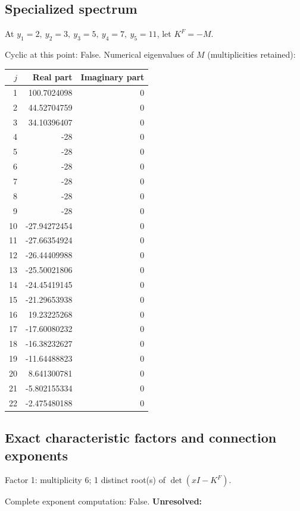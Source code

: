 \documentclass[10pt,a4paper]{article}
\newcommand{\fitmath}[1]{\sbox{\mathbox}{$\displaystyle #1$}\ifdim\wd\mathbox>\linewidth\resizebox{\linewidth}{!}{\usebox{\mathbox}}\else\usebox{\mathbox}\fi}
\begin{document}
\subsection*{Specialized spectrum}
At $y_1=2,\ y_2=3,\ y_3=5,\ y_4=7,\ y_5=11$, let $K^F=-M$.
\begin{center}\fitmath{\Delta=0}\end{center}
Cyclic at this point: False.
Numerical eigenvalues of $M$ (multiplicities retained):
\begin{center}\small\begin{tabular}{rrr}\toprule $j$ & Real part & Imaginary part\\\midrule
1 & 100.7024098 & 0\\
2 & 44.52704759 & 0\\
3 & 34.10396407 & 0\\
4 & -28 & 0\\
5 & -28 & 0\\
6 & -28 & 0\\
7 & -28 & 0\\
8 & -28 & 0\\
9 & -28 & 0\\
10 & -27.94272454 & 0\\
11 & -27.66354924 & 0\\
12 & -26.44409988 & 0\\
13 & -25.50021806 & 0\\
14 & -24.45419145 & 0\\
15 & -21.29653938 & 0\\
16 & 19.23225268 & 0\\
17 & -17.60080232 & 0\\
18 & -16.38232627 & 0\\
19 & -11.64488823 & 0\\
20 & 8.641300781 & 0\\
21 & -5.802155334 & 0\\
22 & -2.475480188 & 0\\
\bottomrule\end{tabular}\end{center}
\subsection*{Exact characteristic factors and connection exponents}
Factor 1: multiplicity 6; 1 distinct root(s) of $\det(xI-K^F)$.
\begin{center}\fitmath{\begin{aligned}p_{1}(x)&=x - 28\end{aligned}}\end{center}
Complete exponent computation: False.
\textbf{Unresolved:}
\end{document}
